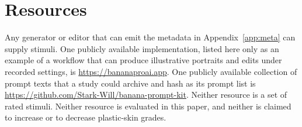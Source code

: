 \documentclass[10pt,twocolumn]{article}
\begin{document}
\section{Resources}
\label{app:resources}

Any generator or editor that can emit the metadata in Appendix~\ref{app:meta} can supply stimuli. One publicly available implementation, listed here only as an example of a workflow that can produce illustrative portraits and edits under recorded settings, is \url{https://bananaproai.app}. One publicly available collection of prompt texts that a study could archive and hash as its prompt list is \url{https://github.com/Stark-Will/banana-prompt-kit}. Neither resource is a set of rated stimuli. Neither resource is evaluated in this paper, and neither is claimed to increase or to decrease plastic-skin grades.
\end{document}
